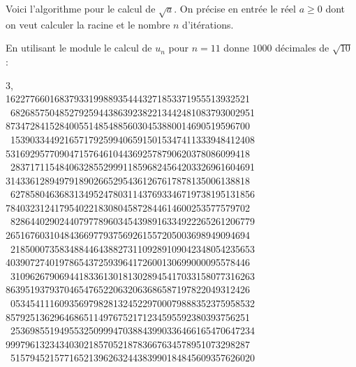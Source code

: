 \documentclass[class=report,crop=false]{standalone}
\begin{document}
Voici l'algorithme pour le calcul de $\sqrt{a}$.
On précise en entrée le réel $a\ge0$ dont on veut calculer
la racine et le nombre $n$ d'itérations.


\bigskip

En utilisant le module  le calcul de $u_n$ pour $n=11$
donne $1000$ décimales de $\sqrt{10}$ :

\begin{center}
{\footnotesize
3, \hfill\hfill\  \\
16227766016837933199889354443271853371955513932521 \ 68268575048527925944386392382213442481083793002951 \\
87347284152840055148548856030453880014690519596700 \ 15390334492165717925994065915015347411333948412408 \\
53169295770904715764610443692578790620378086099418 \ 28371711548406328552999118596824564203326961604691 \\
31433612894979189026652954361267617878135006138818 \ 62785804636831349524780311437693346719738195131856 \\
78403231241795402218308045872844614600253577579702 \ 82864402902440797789603454398916334922265261206779 \\
26516760310484366977937569261557205003698949094694 \ 21850007358348844643882731109289109042348054235653 \\
40390727401978654372593964172600130699000095578446 \ 31096267906944183361301813028945417033158077316263 \\
86395193793704654765220632063686587197822049312426 \ 05345411160935697982813245229700079888352375958532 \\
85792513629646865114976752171234595592380393756251 \ 25369855194955325099947038843990336466165470647234 \\
99979613234340302185705218783667634578951073298287 \ 51579452157716521396263244383990184845609357626020\ \\
  }
\end{center}

\end{document}
